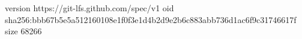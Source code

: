 version https://git-lfs.github.com/spec/v1
oid sha256:bbb67b5e5a512160108e1f0f3e1d4b2d9e2b6c883abb736d1ac6f9c31746617f
size 68266

